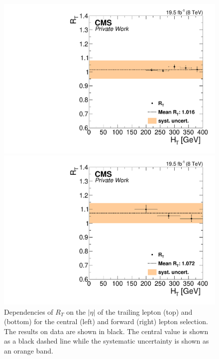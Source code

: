 \begin{figure}[htbp]
\begin{minipage}[t]{0.49\textwidth}
  \includegraphics[width=\textwidth]{plots/BG/trigger/Triggereff_SFvsOF_Syst_AlphaT_HighHTExclusiveCentral_Full2012_HT_None.pdf}
\end{minipage}
\begin{minipage}[t]{0.49\textwidth}
\includegraphics[width=\textwidth]{plots/BG/trigger/Triggereff_SFvsOF_Syst_AlphaT_HighHTExclusiveForward_Full2012_HT_None.pdf}
\end{minipage}
\caption{Dependencies of $R_T$ on the $|\eta|$ of the trailing lepton (top) and \HT (bottom) for the central (left) and forward (right) lepton selection. The results on data are shown in black. The central value is shown as a black dashed line while the systematic uncertainty is shown as an orange band.}
\label{fig:RTDependenciesApp2}
\end{figure}  

